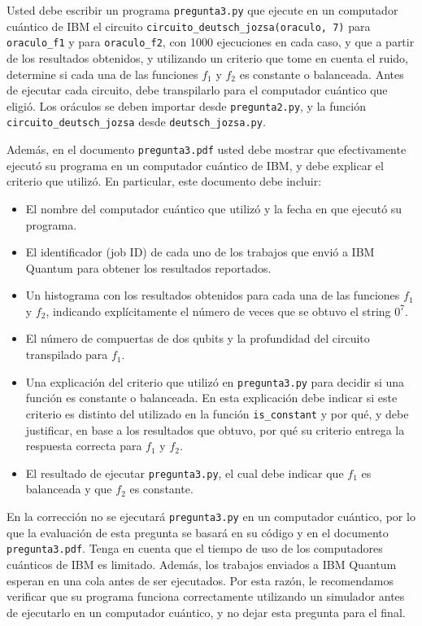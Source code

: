 \documentclass[10pt]{article}
\begin{document}
\begin{enumerate}
  Usted debe escribir un programa \texttt{pregunta3.py} que ejecute en un computador cuántico de IBM
  el circuito \texttt{circuito\_deutsch\_jozsa(oraculo, 7)} para \texttt{oraculo\_f1} y para
  \texttt{oraculo\_f2}, con 1000 ejecuciones en cada caso, y que a partir de los resultados
  obtenidos, y utilizando un criterio que tome en cuenta el ruido, determine si cada una de las
  funciones $f_1$ y $f_2$ es constante o balanceada. Antes de ejecutar cada circuito, debe
  transpilarlo para el computador cuántico que eligió. Los oráculos se deben importar desde
  \texttt{pregunta2.py}, y la función \texttt{circuito\_deutsch\_jozsa} desde
  \texttt{deutsch\_jozsa.py}.

  Además, en el documento \texttt{pregunta3.pdf} usted debe mostrar que efectivamente ejecutó su
  programa en un computador cuántico de IBM, y debe explicar el criterio que utilizó. En
  particular, este documento debe incluir:
  \begin{itemize}
  \item El nombre del computador cuántico que utilizó y la fecha en que ejecutó su programa.
  \item El identificador (job ID) de cada uno de los trabajos que envió a IBM Quantum para obtener
    los resultados reportados.
  \item Un histograma con los resultados obtenidos para cada una de las funciones $f_1$ y $f_2$,
    indicando explícitamente el número de veces que se obtuvo el string $0^7$.
  \item El número de compuertas de dos qubits y la profundidad del circuito transpilado para $f_1$.
  \item Una explicación del criterio que utilizó en \texttt{pregunta3.py} para decidir si una
    función es constante o balanceada. En esta explicación debe indicar si este criterio es
    distinto del utilizado en la función \texttt{is\_constant} y por qué, y debe justificar, en
    base a los resultados que obtuvo, por qué su criterio entrega la respuesta correcta para $f_1$
    y $f_2$.
  \item El resultado de ejecutar \texttt{pregunta3.py}, el cual debe indicar que $f_1$ es
    balanceada y que $f_2$ es constante.
  \end{itemize}

  En la corrección no se ejecutará \texttt{pregunta3.py} en un computador cuántico, por lo que la
  evaluación de esta pregunta se basará en su código y en el documento \texttt{pregunta3.pdf}.
  Tenga en cuenta que el tiempo de uso de los computadores cuánticos de IBM es limitado. Además,
  los trabajos enviados a IBM Quantum esperan en una cola antes de ser ejecutados. Por esta razón,
  le recomendamos verificar que su programa funciona correctamente utilizando un simulador antes
  de ejecutarlo en un computador cuántico, y no dejar esta pregunta para el final.

\end{enumerate}
\end{document}
